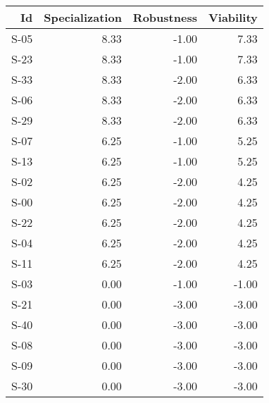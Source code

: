 \begin{tabular}{ | r | r | r | r | }
    \hline
                    Id  &  Specialization  &      Robustness  &       Viability  \\
    \hline
    \hline
                  S-05  &            8.33  &           -1.00  &            7.33  \\
    \hline
                  S-23  &            8.33  &           -1.00  &            7.33  \\
    \hline
                  S-33  &            8.33  &           -2.00  &            6.33  \\
    \hline
                  S-06  &            8.33  &           -2.00  &            6.33  \\
    \hline
                  S-29  &            8.33  &           -2.00  &            6.33  \\
    \hline
                  S-07  &            6.25  &           -1.00  &            5.25  \\
    \hline
                  S-13  &            6.25  &           -1.00  &            5.25  \\
    \hline
                  S-02  &            6.25  &           -2.00  &            4.25  \\
    \hline
                  S-00  &            6.25  &           -2.00  &            4.25  \\
    \hline
                  S-22  &            6.25  &           -2.00  &            4.25  \\
    \hline
                  S-04  &            6.25  &           -2.00  &            4.25  \\
    \hline
                  S-11  &            6.25  &           -2.00  &            4.25  \\
    \hline
                  S-03  &            0.00  &           -1.00  &           -1.00  \\
    \hline
                  S-21  &            0.00  &           -3.00  &           -3.00  \\
    \hline
                  S-40  &            0.00  &           -3.00  &           -3.00  \\
    \hline
                  S-08  &            0.00  &           -3.00  &           -3.00  \\
    \hline
                  S-09  &            0.00  &           -3.00  &           -3.00  \\
    \hline
                  S-30  &            0.00  &           -3.00  &           -3.00  \\

\end{tabular}
